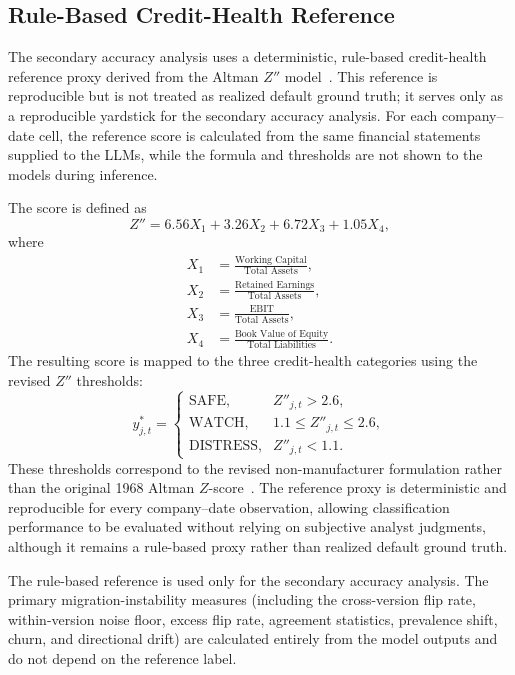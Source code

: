 \documentclass{ieeeaccess}
\begin{document}
\subsection{Rule-Based Credit-Health Reference}
The secondary accuracy analysis uses a deterministic, rule-based credit-health reference proxy derived from the Altman $Z''$ model~\cite{altman_em}. This reference is reproducible but is not treated as realized default ground truth; it serves only as a reproducible yardstick for the secondary accuracy analysis. For each company--date cell, the reference score is calculated from the same financial statements supplied to the LLMs, while the formula and thresholds are not shown to the models during inference.

The score is defined as
\begin{equation}
Z'' = 6.56X_1 + 3.26X_2 + 6.72X_3 + 1.05X_4,
\end{equation}
where
\begin{align}
X_1&=\frac{\text{Working Capital}}{\text{Total Assets}}, \nonumber\\
X_2&=\frac{\text{Retained Earnings}}{\text{Total Assets}}, \nonumber\\
X_3&=\frac{\text{EBIT}}{\text{Total Assets}}, \nonumber\\
X_4&=\frac{\text{Book Value of Equity}}{\text{Total Liabilities}}.
\end{align}
The resulting score is mapped to the three credit-health categories using the revised $Z''$ thresholds:
\begin{equation}
y^{*}_{j,t}=
\begin{cases}
\text{SAFE}, & Z''_{j,t}>2.6,\\[2pt]
\text{WATCH}, & 1.1\leq Z''_{j,t}\leq 2.6,\\[2pt]
\text{DISTRESS}, & Z''_{j,t}<1.1.
\end{cases}
\end{equation}
These thresholds correspond to the revised non-manufacturer formulation rather than the original 1968 Altman $Z$-score~\cite{altman}. The reference proxy is deterministic and reproducible for every company--date observation, allowing classification performance to be evaluated without relying on subjective analyst judgments, although it remains a rule-based proxy rather than realized default ground truth.

The rule-based reference is used only for the secondary accuracy analysis. The primary migration-instability measures (including the cross-version flip rate, within-version noise floor, excess flip rate, agreement statistics, prevalence shift, churn, and directional drift) are calculated entirely from the model outputs and do not depend on the reference label.
\end{document}
